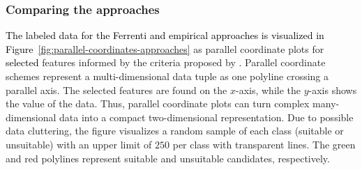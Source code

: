 \documentclass[superscriptaddress,unsortedaddress,
 amsmath,amssymb,
 aps,
]{revtex4-2}
\newcommand{\mrk}[1]{\textcolor{black}{#1}}
\begin{document}
\subsubsection*{Comparing the approaches}

\mrk{The labeled data for the Ferrenti and empirical approaches is visualized in Figure~\ref{fig:parallel-coordinates-approaches}} as parallel coordinate plots for \mrk{selected} features informed by the criteria proposed by \citeauthor{Weber2010} \cite{Weber2010}. Parallel coordinate schemes \cite{Inselberga1990, Inselberg1985} represent a multi-dimensional data tuple as one polyline crossing a parallel axis. The selected features are found on the $x$-axis, while the $y$-axis shows the value of the data. Thus, parallel coordinate plots can turn complex many-dimensional data into a compact  two-dimensional representation. Due to possible data cluttering, the figure visualizes a random sample of each class (suitable or unsuitable) with an upper limit of $250$ per class with transparent lines. The green and red polylines represent suitable and unsuitable candidates, respectively. 
\end{document}

